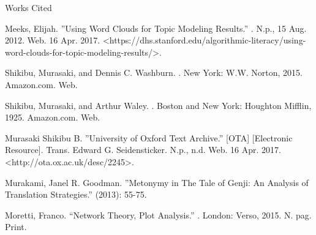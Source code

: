 \documentclass[12pt]{article}
\newcommand{\bibent}{\noindent \hangindent 40pt}
\newenvironment{workscited}{\newpage \begin{center} Works Cited \end{center}}{\newpage }
\begin{document}
\begin{flushleft}
\begin{spacing}{2.0}
\begin{workscited}
\bibent Meeks, Elijah. ''Using Word Clouds for Topic Modeling Results.'' . N.p., 15 Aug. 2012. Web. 16 Apr. 2017. <https://dhs.stanford.edu/algorithmic-literacy/using-word-clouds-for-topic-modeling-results/>.

\bibent Shikibu, Murasaki, and Dennis C. Washburn. . New York: W.W. Norton, 2015. Amazon.com. Web.

\bibent Shikibu, Murasaki, and Arthur Waley. . Boston and New York: Houghton Mifflin, 1925. Amazon.com. Web.

\bibent Murasaki Shikibu B. ''University of Oxford Text Archive.'' [OTA]  [Electronic Resource]. Trans. Edward G. Seidensticker. N.p., n.d. Web. 16 Apr. 2017. <http://ota.ox.ac.uk/desc/2245>.

\bibent Murakami, Janel R. Goodman. ''Metonymy in The Tale of Genji: An Analysis of Translation Strategies.''  (2013): 55-75.	

\bibent Moretti, Franco. ``Network Theory, Plot Analysis.'' . London: Verso, 2015. N. pag. Print.

\end{workscited}



\end{spacing}
\end{flushleft}
\end{document}
